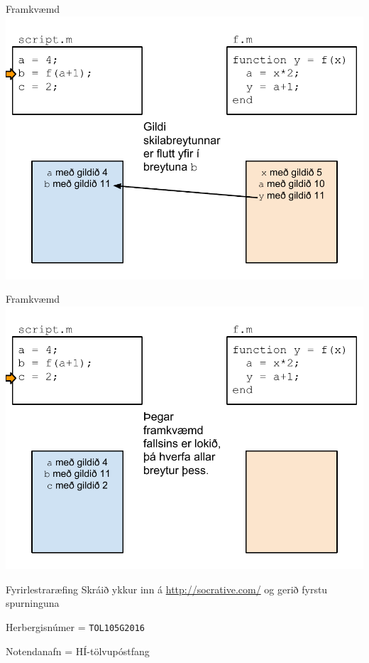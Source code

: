 \documentclass{beamer}
\begin{document}
\begin{frame}{Framkvæmd}
\includegraphics[width=\textwidth]{Pics/framkvaemd-falls-6}
\end{frame}
\begin{frame}{Framkvæmd}
\includegraphics[width=\textwidth]{Pics/framkvaemd-falls-7}
\end{frame}

\begin{frame}{Fyrirlestraræfing}
Skráið ykkur inn á \url{http://socrative.com/} og gerið fyrstu spurninguna

Herbergisnúmer = \texttt{TOL105G2016}

Notendanafn = HÍ-tölvupóstfang
\end{frame}
\end{document}

